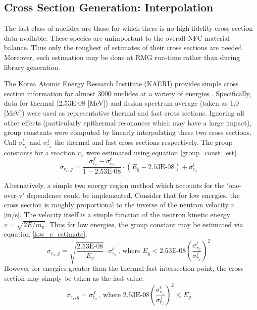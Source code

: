 \subsection{Cross Section Generation: Interpolation}
\label{mg:xs_gen_interpolation}
The last class of nuclides are those for which there is no high-fidelity cross section data 
available.  These species are unimportant to the overall NFC material balance. 
Thus only the roughest of estimates of their cross sections are needed.  Moreover, such estimation 
may be done at RMG run-time rather than during library generation.

The Korea Atomic Energy Research Institute (KAERI) provides simple cross section information
for almost 3000 nuclides at a variety of energies \cite{KAER2000}.  Specifically, data for
thermal (2.53E-08 [MeV]) and fission spectrum average (taken as 1.0 [MeV]) were used as representative
thermal and fast cross sections.  Ignoring all other effects (particularly epithermal resonances which 
may have a large impact),  group constants were computed by linearly interpolating these two cross sections.  
Call $\sigma_{r_x}^t$ and $\sigma_{r_x}^f$ the thermal and fast cross sections respectively.  The group
constants for a reaction $r_x$ were estimated using equation \ref{group_const_est}.
\begin{equation}
\label{group_const_est}
\sigma_{r_x,g} = \frac{\sigma_{r_x}^f - \sigma_{r_x}^t}{1 - \mbox{2.53E-08}} \cdot (E_g - \mbox{2.53E-08}) + \sigma_{r_x}^t
\end{equation}

Alternatively, a simple two energy region method which accounts for the `one-over-v' dependence
could be implemented.  Consider that for low energies, the cross section is roughly proportional 
to the inverse of the neutron velocity $v$ [m/s].  The velocity itself is a simple function of 
the neutron kinetic energy $v = \sqrt{2E/m_n}$.  Thus for low energies, the group constant may 
be estimated via equation \ref{low_e_estimate}.
\begin{equation}
\label{low_e_estimate}
\sigma_{r_x,g} = \sqrt{\frac{\mbox{2.53E-08}}{E_g}} \cdot \sigma_{r_x}^t \, \mbox{, where } E_g < \mbox{2.53E-08} \left(\frac{\sigma_{r_x}^t}{\sigma_{r_x}^f}\right)^2
\end{equation}
However for energies greater than the thermal-fast intersection point, the cross section may simply be taken as 
the fast value.
\begin{equation}
\label{low_e_estimate}
\sigma_{r_x,g} = \sigma_{r_x}^f \, \mbox{, where } \mbox{2.53E-08} \left(\frac{\sigma_{r_x}^t}{\sigma_{r_x}^f}\right)^2 \le E_g
\end{equation}





